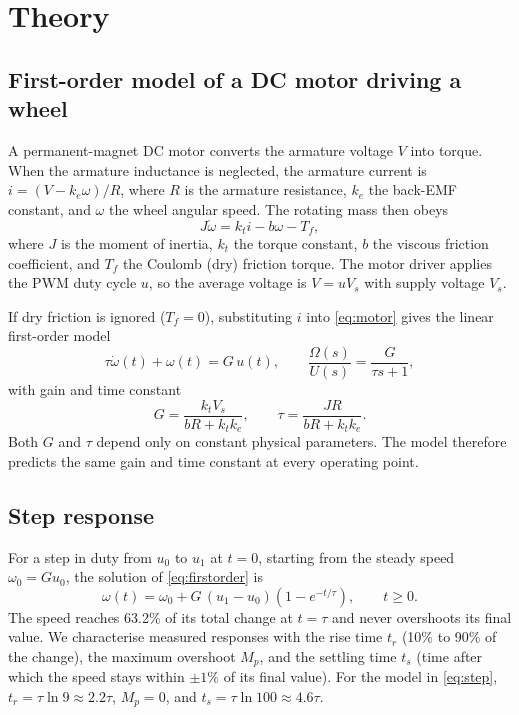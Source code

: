 \section{Theory}
\label{sec:theory}

\subsection{First-order model of a DC motor driving a wheel}
A permanent-magnet DC motor converts the armature voltage $V$ into torque. When the armature inductance is neglected, the armature current is $i=(V-k_e\omega)/R$, where $R$ is the armature resistance, $k_e$ the back-EMF constant, and $\omega$ the wheel angular speed. The rotating mass then obeys
\begin{equation}
J\dot{\omega} = k_t i - b\omega - T_f,
\label{eq:motor}
\end{equation}
where $J$ is the moment of inertia, $k_t$ the torque constant, $b$ the viscous friction coefficient, and $T_f$ the Coulomb (dry) friction torque. The motor driver applies the PWM duty cycle $u$, so the average voltage is $V=uV_s$ with supply voltage $V_s$.

If dry friction is ignored ($T_f=0$), substituting $i$ into \eqref{eq:motor} gives the linear first-order model \parencite{franklin2019FeedbackControlDynamic}
\begin{equation}
\tau\dot{\omega}(t)+\omega(t)=G\,u(t),
\qquad
\frac{\Omega(s)}{U(s)}=\frac{G}{\tau s+1},
\label{eq:firstorder}
\end{equation}
with gain and time constant
\begin{equation}
G=\frac{k_tV_s}{bR+k_tk_e},
\qquad
\tau=\frac{JR}{bR+k_tk_e}.
\label{eq:params}
\end{equation}
Both $G$ and $\tau$ depend only on constant physical parameters. The model therefore predicts the same gain and time constant at every operating point.

\subsection{Step response}
For a step in duty from $u_0$ to $u_1$ at $t=0$, starting from the steady speed $\omega_0=Gu_0$, the solution of \eqref{eq:firstorder} is
\begin{equation}
\omega(t)=\omega_0+G\,(u_1-u_0)\left(1-e^{-t/\tau}\right),\qquad t\ge 0.
\label{eq:step}
\end{equation}
The speed reaches 63.2\% of its total change at $t=\tau$ and never overshoots its final value. We characterise measured responses with the rise time $t_r$ (10\% to 90\% of the change), the maximum overshoot $M_p$, and the settling time $t_s$ (time after which the speed stays within $\pm1\%$ of its final value). For the model in \eqref{eq:step}, $t_r=\tau\ln 9\approx2.2\tau$, $M_p=0$, and $t_s=\tau\ln 100\approx4.6\tau$.

